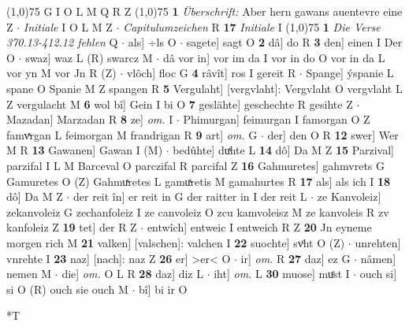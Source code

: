 \documentclass[8pt,a4paper,notitlepage]{article}
\begin{document}
\begin{table}[ht]
\begin{minipage}[t]{0.5\linewidth}
\begin{tabular}{rl}
\end{tabular}
\scriptsize
\line(1,0){75} \newline
G I O L M Q R Z \newline
\line(1,0){75} \newline
\textbf{1} \textit{Überschrift:} Aber hern gawans auentevre eine Z   $\cdot$ \textit{Initiale} I O L M Z   $\cdot$ \textit{Capitulumzeichen} R  \textbf{17} \textit{Initiale} I  \newline
\line(1,0){75} \newline
\textbf{1} \textit{Die Verse 370.13-412.12 fehlen} Q   $\cdot$ als] ÷ls O  $\cdot$ sagete] sagt O \textbf{2} dâ] do R \textbf{3} den] einen I Der O  $\cdot$ swaz] waz L (R) swarcz M  $\cdot$ dâ vor in] vor im da I vor in do O vor in da L vor yn M vor Jn R (Z)  $\cdot$ vlôch] floc G \textbf{4} râvît] ros I gereit R  $\cdot$ Spange] ýspanie L spane O Spanie M Z spangen R \textbf{5} Vergulaht] [vergvlaht]: Vergvlaht O vergvlaht L Z vergulacht M \textbf{6} wol bî] Gein I bi O \textbf{7} geslähte] geschechte R gesihte Z  $\cdot$ Mazadan] Marzadan R \textbf{8} ze] \textit{om.} I  $\cdot$ Phimurgan] feimurgan I famorgan O Z famvͯrgan L feimorgan M frandrigan R \textbf{9} art] \textit{om.} G  $\cdot$ der] den O R \textbf{12} swer] Wer M R \textbf{13} Gawanen] Gawan I (M)  $\cdot$ bedûhte] duͯhte L \textbf{14} dô] Da M Z \textbf{15} Parzival] parzifal I L M Barceval O parczifal R parcifal Z \textbf{16} Gahmuretes] gahmvrets G Gamuretes O (Z) Gahmuͯretes L gamuͯretis M gamahurtes R \textbf{17} als] als ich I \textbf{18} dô] Da M Z  $\cdot$ der reit în] er reit in G der raitter in I der reit L  $\cdot$ ze Kanvoleiz] zekanvoleiz G zechanfoleiz I ze canvoleiz O zcu kamvoleisz M ze kanvoleis R zv kanfoleiz Z \textbf{19} tet] der R Z  $\cdot$ entwîch] entweic I entweich R Z \textbf{20} Jn eyneme morgen rich M \textbf{21} valken] [valschen]: valchen I \textbf{22} suochte] svͦht O (Z)  $\cdot$ unrehten] vnrehte I \textbf{23} naz] [nach]: naz Z \textbf{26} er] >er< O  $\cdot$ ir] \textit{om.} R \textbf{27} daz] ez G  $\cdot$ nâmen] nemen M  $\cdot$ die] \textit{om.} O L R \textbf{28} daz] diz L  $\cdot$ iht] \textit{om.} L \textbf{30} muose] muͤst I  $\cdot$ ouch si] si O (R) ouch sie ouch M  $\cdot$ bî] bi ir O \newline
\end{minipage}
\hspace{0.5cm}
\begin{minipage}[t]{0.5\linewidth}
\small
\begin{center}*T
\end{center}

\end{minipage}
\end{table}
\end{document}
